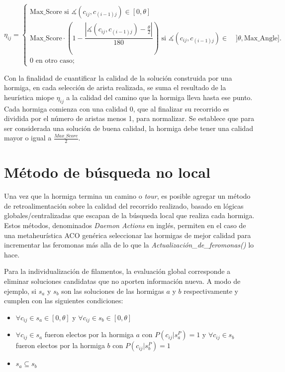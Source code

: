 \begin{equation}
    \eta_{ij} = 
        \begin{cases} 
        \text{Max\_Score si } \measuredangle(c_{ij}, c_{(i-1)j}) \in [0, \theta]\\[3ex]
        
        \text{Max\_Score} \cdot \left(1 - \dfrac{ \left| \measuredangle(c_{ij}, c_{(i-1)j}) - \frac{\theta}{2} \right|} {180} \right)  \text{ si } \measuredangle(c_{ij}, c_{(i-1)j}) \in \quad ]\theta, \text{Max\_Angle}].\\[3ex]
        
        \text{0 en otro caso;}
        \end{cases}
    \label{eq:heuristicaMiope}
\end{equation}

Con la finalidad de cuantificar la calidad de la soluci\'on construida por una hormiga, en cada selecci\'on de arista realizada, se suma el resultado de la heur\'istica miope $\eta_{ij}$ a la calidad del camino que la hormiga lleva hasta ese punto. Cada hormiga comienza con una calidad 0, que al finalizar su recorrido es dividida por el n\'umero de aristas menos 1, para normalizar. Se establece que para ser considerada una soluci\'on de buena calidad, la hormiga debe tener una calidad mayor o igual a $\frac{Max\_Score}{2}$.
    
\section{M\'etodo de b\'usqueda no local}
Una vez que la hormiga termina un camino o {\it tour}, es posible agregar un m\'etodo de retroalimentaci\'on sobre la calidad del recorrido realizado, basado en l\'ogicas globales/centralizadas que escapan de la b\'usqueda local que realiza cada hormiga. Estos m\'etodos, denominados {\it Daemon Actions} en ingl\'es, permiten en el caso de una metaheur\'istica ACO gen\'erica seleccionar las hormigas de mejor calidad para incrementar las feromonas m\'as alla de lo que la {\it Actualizaci\'on\_de\_feromonas()} lo hace. 

Para la individualizaci\'on de filamentos, la evaluaci\'on global corresponde a eliminar soluciones candidatas que no aporten informaci\'on nueva. A modo de ejemplo, si $s_a$ y $s_b$ son las soluciones de las hormigas $a$ y $b$ respectivamente y cumplen con las siguientes condiciones:

\begin{itemize}
    \item $\forall c_{ij} \in s_a \in [0, \theta]$ y $\forall c_{ij} \in s_b \in [0, \theta]$
    \item $\forall c_{ij} \in s_a$ fueron electos por la hormiga $a$ con $P(c_{ij} | s_{a}^{P}) = 1$ y $\forall c_{ij} \in s_b$ fueron electos por la hormiga $b$ con $P(c_{ij} | s_{b}^{P}) = 1$
    \item $s_a \subseteq s_b$
\end{itemize}

